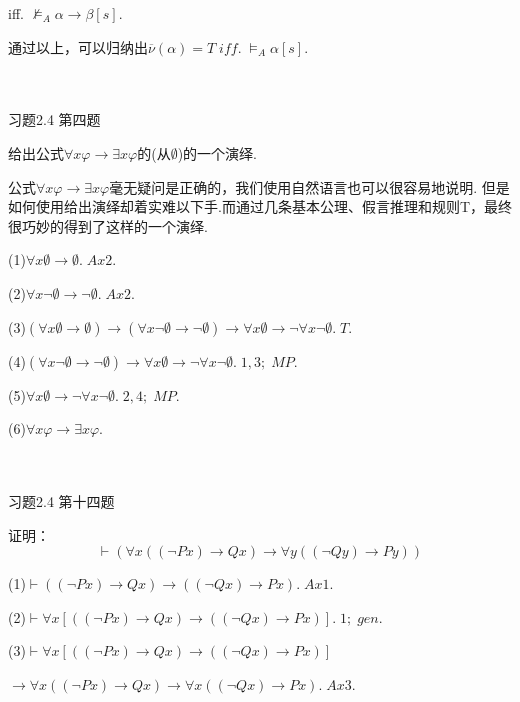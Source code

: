 iff. $\nvDash_{A} \alpha \rightarrow \beta [s]$.

通过以上，可以归纳出$ \overline{\nu} (\alpha)=T     \;   iff. \;  \models_{A}\alpha[s].$

\\ \hspace*{\fill} \\

习题2.4 第四题

给出公式$\forall x \varphi \rightarrow \exists x \varphi$的(从$\emptyset$)的一个演绎.

公式$\forall x \varphi \rightarrow \exists x \varphi$毫无疑问是正确的，我们使用自然语言也可以很容易地说明. 但是如何使用给出演绎却着实难以下手.而通过几条基本公理、假言推理和规则T，最终很巧妙的得到了这样的一个演绎.

(1)$\forall x \emptyset \rightarrow \emptyset. \; Ax2.$

(2)$\forall x \neg \emptyset \rightarrow \neg \emptyset. \; Ax2.$

(3)$(\forall x \emptyset \rightarrow \emptyset) \rightarrow (\forall x \neg \emptyset \rightarrow \neg \emptyset) \rightarrow \forall x \emptyset \rightarrow \neg \forall x \neg \emptyset. \; T.$

(4)$(\forall x \neg \emptyset \rightarrow \neg \emptyset) \rightarrow \forall x \emptyset \rightarrow \neg \forall x \neg \emptyset. \; 1, 3; \; MP.$

(5)$\forall x \emptyset \rightarrow \neg \forall x \neg \emptyset. \; 2, 4; \; MP.$

(6)$\forall x \varphi \rightarrow \exists x \varphi.$

\\ \hspace*{\fill} \\

习题2.4 第十四题

证明：$$\vdash (\forall x((\neg Px) \rightarrow Qx) \rightarrow \forall y((\neg Qy) \rightarrow Py))$$

(1)$\vdash ((\neg Px) \rightarrow Qx) \rightarrow ((\neg Qx) \rightarrow Px). \; Ax1.$

(2)$\vdash \forall x[((\neg Px) \rightarrow Qx) \rightarrow ((\neg Qx) \rightarrow Px)]. \; 1; \; gen.$

(3)$\vdash \forall x[((\neg Px) \rightarrow Qx) \rightarrow ((\neg Qx) \rightarrow Px)]$ 

$\rightarrow \forall x((\neg Px) \rightarrow Qx) \rightarrow \forall x((\neg Qx) \rightarrow Px). \; Ax3.$

